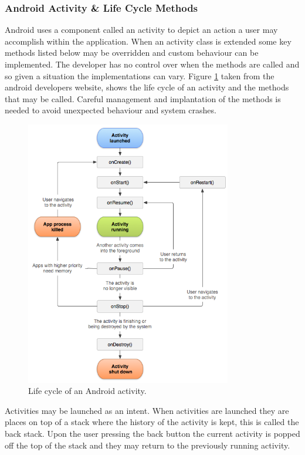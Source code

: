 \documentclass[a4paper, 11pt]{article}
\begin{document}
\subsubsection{Android Activity \& Life Cycle Methods}
Android uses a component called an activity to depict an action a user may accomplish within the application. When an activity class is extended some key methods listed below may be overridden and custom behaviour can be implemented. The developer has no control over when the methods are called and so given a situation the implementations can vary. Figure \ref{fig:activity_lifecycle} taken from the android developers website, shows the life cycle of an activity and the methods that may be called. Careful management and implantation of the methods is needed to avoid unexpected behaviour and system crashes.

\begin{figure}[!hp]
\centering
\includegraphics[width=9cm]{activity_lifecycle}
\caption{Life cycle of an Android activity.} \label{fig:activity_lifecycle}
\end{figure}

Activities may be launched as an intent. When activities are launched they are places on top of a stack where the history of the activity is kept, this is called the back stack. Upon the user pressing the back button the current activity is popped off the top of the stack and they may return to the previously running activity. 
\end{document}
